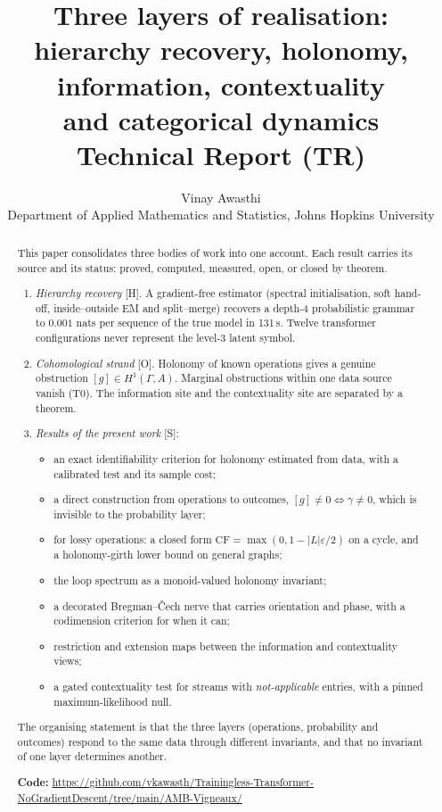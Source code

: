 \documentclass[11pt]{article}
\title{Three layers of realisation:\\ hierarchy recovery, holonomy, information, contextuality\\ and categorical dynamics\\[4pt] \large Technical Report (TR)}
\author{Vinay Awasthi\\ \small Department of Applied Mathematics and Statistics, Johns Hopkins University}
\date{}
\theoremstyle{definition}
\theoremstyle{remark}
\newcommand{\CF}{\mathrm{CF}}
\newcommand{\src}[1]{\textsf{\small[#1]}}
\begin{document}
\maketitle

\begin{abstract}
This paper consolidates three bodies of work into one account. Each result carries its source and its status: proved, computed, measured, open, or closed by theorem.
\begin{enumerate}
  \item \emph{Hierarchy recovery} \src{H}. A gradient-free estimator (spectral initialisation, soft hand-off, inside--outside EM and split--merge) recovers a depth-4 probabilistic grammar to $0.001$ nats per sequence of the true model in 131\,s. Twelve transformer configurations never represent the level-3 latent symbol.
  \item \emph{Cohomological strand} \src{O}. Holonomy of known operations gives a genuine obstruction $[g]\in H^1(\Gamma,A)$. Marginal obstructions within one data source vanish (T0). The information site and the contextuality site are separated by a theorem.
  \item \emph{Results of the present work} \src{S}:
  \begin{itemize}
    \item an exact identifiability criterion for holonomy estimated from data, with a calibrated test and its sample cost;
    \item a direct construction from operations to outcomes, $[g]\ne0\iff\gamma\ne0$, which is invisible to the probability layer;
    \item for lossy operations: a closed form $\CF=\max(0,1-|L|\varepsilon/2)$ on a cycle, and a holonomy-girth lower bound on general graphs;
    \item the loop spectrum as a monoid-valued holonomy invariant;
    \item a decorated Bregman--\v{C}ech nerve that carries orientation and phase, with a codimension criterion for when it can;
    \item restriction and extension maps between the information and contextuality views;
    \item a gated contextuality test for streams with \emph{not-applicable} entries, with a pinned maximum-likelihood null.
  \end{itemize}
\end{enumerate}
The organising statement is that the three layers (operations, probability and outcomes) respond to the same data through different invariants, and that no invariant of one layer determines another.
\par\smallskip\noindent\textbf{Code:} \url{https://github.com/vkawasth/Trainingless-Transformer-NoGradientDescent/tree/main/AMB-Vigneaux/}
\end{abstract}
\end{document}
